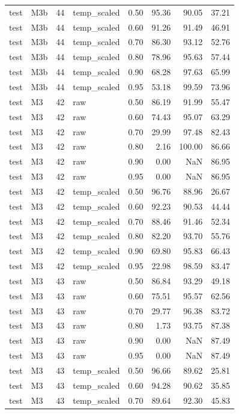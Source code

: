 \begin{tabular}{llrlrrrr}
test & M3b & 44 & temp\_scaled & 0.50 & 95.36 & 90.05 & 37.21 \\
test & M3b & 44 & temp\_scaled & 0.60 & 91.26 & 91.49 & 46.91 \\
test & M3b & 44 & temp\_scaled & 0.70 & 86.30 & 93.12 & 52.76 \\
test & M3b & 44 & temp\_scaled & 0.80 & 78.96 & 95.63 & 57.44 \\
test & M3b & 44 & temp\_scaled & 0.90 & 68.28 & 97.63 & 65.99 \\
test & M3b & 44 & temp\_scaled & 0.95 & 53.18 & 99.59 & 73.96 \\
test & M3 & 42 & raw & 0.50 & 86.19 & 91.99 & 55.47 \\
test & M3 & 42 & raw & 0.60 & 74.43 & 95.07 & 63.29 \\
test & M3 & 42 & raw & 0.70 & 29.99 & 97.48 & 82.43 \\
test & M3 & 42 & raw & 0.80 & 2.16 & 100.00 & 86.66 \\
test & M3 & 42 & raw & 0.90 & 0.00 & NaN & 86.95 \\
test & M3 & 42 & raw & 0.95 & 0.00 & NaN & 86.95 \\
test & M3 & 42 & temp\_scaled & 0.50 & 96.76 & 88.96 & 26.67 \\
test & M3 & 42 & temp\_scaled & 0.60 & 92.23 & 90.53 & 44.44 \\
test & M3 & 42 & temp\_scaled & 0.70 & 88.46 & 91.46 & 52.34 \\
test & M3 & 42 & temp\_scaled & 0.80 & 82.20 & 93.70 & 55.76 \\
test & M3 & 42 & temp\_scaled & 0.90 & 69.80 & 95.83 & 66.43 \\
test & M3 & 42 & temp\_scaled & 0.95 & 22.98 & 98.59 & 83.47 \\
test & M3 & 43 & raw & 0.50 & 86.84 & 93.29 & 49.18 \\
test & M3 & 43 & raw & 0.60 & 75.51 & 95.57 & 62.56 \\
test & M3 & 43 & raw & 0.70 & 29.77 & 96.38 & 83.72 \\
test & M3 & 43 & raw & 0.80 & 1.73 & 93.75 & 87.38 \\
test & M3 & 43 & raw & 0.90 & 0.00 & NaN & 87.49 \\
test & M3 & 43 & raw & 0.95 & 0.00 & NaN & 87.49 \\
test & M3 & 43 & temp\_scaled & 0.50 & 96.66 & 89.62 & 25.81 \\
test & M3 & 43 & temp\_scaled & 0.60 & 94.28 & 90.62 & 35.85 \\
test & M3 & 43 & temp\_scaled & 0.70 & 89.64 & 92.30 & 45.83 \\

\end{tabular}
